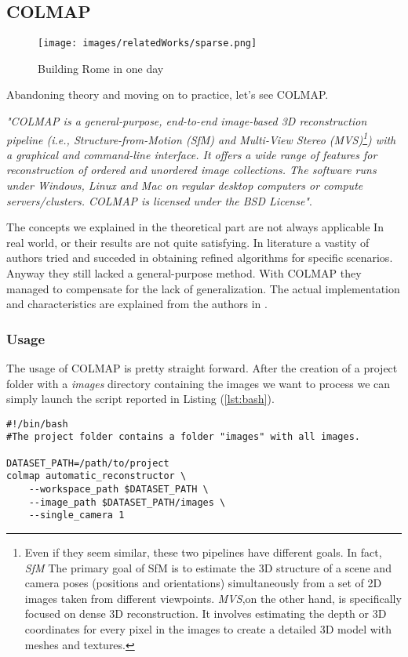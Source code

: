 \subsection{COLMAP}
\begin{figure}
    \centering
    \texttt{[image: images/relatedWorks/sparse.png]} %
    \caption{Building Rome in one day}\label{fig:colmap_image}
\end{figure}
Abandoning theory and moving on to practice, let's see COLMAP.

\textit{"COLMAP is a general-purpose, end-to-end image-based 
3D reconstruction pipeline (i.e., Structure-from-Motion (SfM)
 and Multi-View Stereo (MVS)\footnote{Even if they seem similar, these
 two pipelines have different goals. In fact, \textit{SfM} The
  primary goal of SfM is to estimate the 3D structure of 
  a scene and camera poses (positions and orientations) 
  simultaneously from a set of 2D images taken from different
   viewpoints. \textit{MVS},on the other hand, is specifically focused on dense 3D reconstruction. It involves estimating the depth or 3D coordinates 
   for every pixel in the images to create a detailed 3D model with
   meshes and textures.
}) with a graphical and command-line 
 interface. It offers a wide range of features for 
 reconstruction of ordered and unordered image collections. 
 The software runs under Windows, Linux and Mac on regular
  desktop computers or compute servers/clusters. COLMAP is
   licensed under the BSD License"}\cite{colmap}.

The concepts we explained in the theoretical part are not always applicable In
real world, or their results are not quite satisfying. In literature a vastity of authors
tried and succeded in obtaining refined algorithms for specific scenarios. 
Anyway they still lacked a general-purpose method. With COLMAP they managed
to compensate for the lack of generalization. The actual implementation and characteristics
are explained from the authors in \cite{schoenberger2016sfm,schoenberger2016mvs}.

\subsubsection{Usage}
The usage of COLMAP is pretty straight forward. After the creation of a project
folder with a \textit{images} directory containing the images we want to process we 
can simply launch the script reported in Listing (\ref{lst:bash}).
\begin{lstlisting}[style=vscode, caption={Automatic COLMAP Reconstruction}, label={lst:bash}]
#!/bin/bash
#The project folder contains a folder "images" with all images.

DATASET_PATH=/path/to/project
colmap automatic_reconstructor \
    --workspace_path $DATASET_PATH \
    --image_path $DATASET_PATH/images \
    --single_camera 1
    \end{lstlisting}

